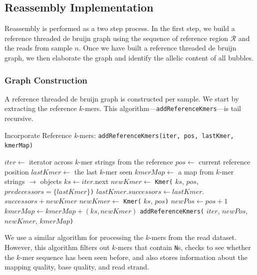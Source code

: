 \documentclass[masters]{ucbthesis}
\begin{document}
\subsection{Reassembly Implementation}
\label{sec:reassembly-implementation}

Reassembly is performed as a two step process. In the first step, we build a reference threaded
de bruijn graph using the sequence of reference region $\mathcal{R}$ and the reads from sample $n$.
Once we have built a reference threaded de bruijn graph, we then elaborate the graph and identify
the allelic content of all bubbles.

\subsubsection{Graph Construction}
\label{sec:graph-construction}

A reference threaded de bruijn graph is constructed per sample. We start by extracting the
reference $k$-mers. This algorithm---\texttt{addReferenceKmers}---is tail recursive.

\begin{algorithm}
\caption{Incorporate Reference \emph{k}-mers: \texttt{addReferenceKmers(iter, pos, lastKmer, kmerMap)}}
\label{alg:build-reference-kmers}
\begin{algorithmic}
\STATE $iter \leftarrow$ iterator across $k$-mer strings from the reference
\STATE $pos \leftarrow$ current reference position
\STATE $lastKmer \leftarrow$ the last $k$-mer seen
\STATE $kmerMap \leftarrow$ a map from $k$-mer strings $\rightarrow$ objects
\STATE $ks \leftarrow iter$.next
\STATE $newKmer \leftarrow $ \texttt{Kmer(} $ks$, $pos$, $predecessors = \{lastKmer\}$\texttt{)}
\STATE $lastKmer$.$successors \leftarrow lastKmer$.$successors + newKmer$
\ELSE
\STATE $newKmer \leftarrow $ \texttt{Kmer(} $ks$, $pos$\texttt{)}
\ENDIF
\STATE $newPos \leftarrow pos + 1$
\STATE $kmerMap \leftarrow kmerMap + (ks, newKmer)$
\STATE \texttt{addReferenceKmers(} $iter$, $newPos$, $newKmer$, $kmerMap$\texttt{)}
\ENDIF
\end{algorithmic}
\end{algorithm}

We use a similar algorithm for processing the $k$-mers from the read dataset. However, this
algorithm filters out $k$-mers that contain \texttt{N}s, checks to see whether the $k$-mer
sequence has been seen before, and also stores information about the mapping quality, base
quality, and read strand.
\end{document}
